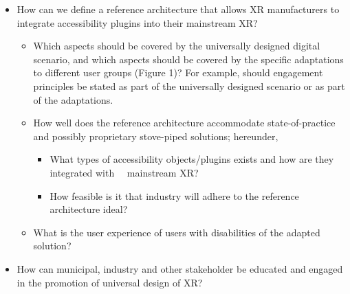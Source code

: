\begin{itemize}
\item How can we define a reference architecture that allows XR manufacturers to integrate accessibility plugins into
their mainstream XR? 

\begin{itemize}
\item Which aspects should be covered by the universally designed digital scenario, and which aspects should be covered
by the specific adaptations to different user groups (Figure 1)? For example, should engagement principles be stated as
part of the universally designed scenario or as part of the adaptations. 
\item How well does the reference architecture accommodate state-of-practice and possibly proprietary stove-piped
solutions; hereunder,

\begin{itemize}
\item What types of accessibility objects/plugins exists and how are they integrated with \ \ mainstream XR? 
\item How feasible is it that industry will adhere to the reference architecture ideal? 
\end{itemize}
\item What is the user experience of users with disabilities of the adapted solution? 
\end{itemize}
\end{itemize}
\begin{itemize}
\item How can municipal, industry and other stakeholder be educated and engaged in the promotion of universal design of
XR? 
\end{itemize}
